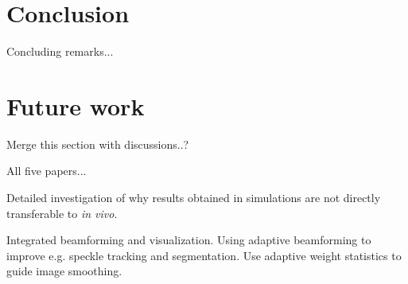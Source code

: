 \section{Conclusion}

Concluding remarks...

\section{Future work}

Merge this section with discussions..?

All five papers...

Detailed investigation of why results obtained in simulations are not directly transferable to \textit{in vivo}.

Integrated beamforming and visualization. Using adaptive beamforming to improve e.g. speckle tracking and segmentation. Use adaptive weight statistics to guide image smoothing.

\endinput